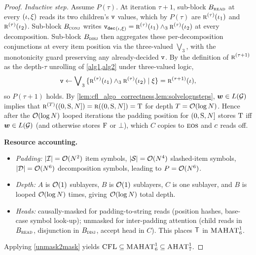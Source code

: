 \documentclass{article}
\begin{document}
\begin{proof}
        \emph{Inductive step.} Assume $P(\tau)$.
        At iteration $\tau + 1$, sub-block $B_{\textsc{read}}$ at every $({{ \iota}}, {{\xi}})$ reads its two children's ${\mathtt{v}}$ values, which by $P(\tau)$ are ${\textsc{r}}^{(\tau)}({{ \iota}}_1)$ and ${\textsc{r}}^{(\tau)}({{ \iota}}_2)$.
        Sub-block $B_{\textsc{conj}}$ writes ${\mathtt{v}_\mathtt{dec}}_{({{ \iota}}, {{\xi}})} = {\textsc{r}}^{(\tau)}({{ \iota}}_1) \wedge_3 {\textsc{r}}^{(\tau)}({{ \iota}}_2)$ at every decomposition.
        Sub-block $B_{\textsc{disj}}$ then aggregates these per-decomposition conjunctions at every item position via the three-valued $\bigvee_3$, with the monotonicity guard preserving any already-decided ${\mathtt{v}}$.
        By the definition of ${\textsc{r}}^{(\tau+1)}$ as the depth-$\tau$ unrolling of \cref{alg1,alg2} under three-valued logic,
        \begin{equation*}
            {\mathtt{v}} \gets \bigvee\nolimits_3{{\{ {\textsc{r}}^{(\tau)}({{ \iota}}_1) \wedge_3 {\textsc{r}}^{(\tau)}({{ \iota}}_2) \mid {{\xi}} \}}} = {\textsc{r}}^{(\tau+1)}({{ \iota}}),
        \end{equation*}
        so $P(\tau + 1)$ holds.
        By \cref{lem:cfl_algo_correctness,lem:solvelognsteps}, ${{\boldsymbol{w}}}\in{L}({{ \mathcal{G}}})$ implies that ${\textsc{r}}^{(T)}((0, {{ \mathrm{S}}}, {{ N}}])={\textsc{r}}((0, {{ \mathrm{S}}}, {{ N}}])={\mathbin{\mathrm{T}}}$ for depth $T = {{ \mathcal{O}}}(\log {{ N}})$.
        Hence after the ${{ \mathcal{O}}}(\log {{ N}})$ looped iterations the padding position for $(0, {{ \mathrm{S}}}, {{ N}}]$ stores ${\mathbin{\mathrm{T}}}$ iff ${{\boldsymbol{w}}} \in {L}({{ \mathcal{G}}})$ (and otherwise stores ${\mathbin{\mathrm{F}}}$ or $\bot$), which $C$ copies to ${{\textsc{eos}}}$ and ${{ c}}$ reads off.
    
    \textbf{Resource accounting.}
    \begin{itemize}[noitemsep,topsep=0pt,leftmargin=15pt]
        \item \emph{Padding:} $|{{\mathcal{I}}}| = {{ \mathcal{O}}}({{ N}}^2)$ item symbols, $|{{\mathcal{S}}}| = {{ \mathcal{O}}}({{ N}}^4)$ slashed-item symbols, $|{{\mathcal{D}}}| = {{ \mathcal{O}}}({{ N}}^6)$ decomposition symbols, leading to ${P}={{ \mathcal{O}}}({{ N}}^6)$.
        \item \emph{Depth:} $A$ is ${{ \mathcal{O}}}(1)$ sublayers, $B$ is ${{ \mathcal{O}}}(1)$ sublayers, $C$ is one sublayer, and $B$ is looped ${{ \mathcal{O}}}(\log {{ N}})$ times, giving ${{ \mathcal{O}}}(\log {{ N}})$ total depth.
        \item \emph{Heads:} causally-masked for padding-to-string reads (position hashes, base-case symbol look-up); unmasked for inter-padding attention (child reads in $B_{\textsc{read}}$, disjunction in $B_{\textsc{disj}}$, accept head in $C$). This places $\tf$ in ${{\textsc{MAHAT}}}^1_6$.
    \end{itemize}
    Applying \cref{unmask2mask} yields ${\textsc{CFL}} \subseteq {{\textsc{MAHAT}}}^1_6 \subseteq {{\textsc{AHAT}}}^1_7$.
\end{proof}
\end{document}
